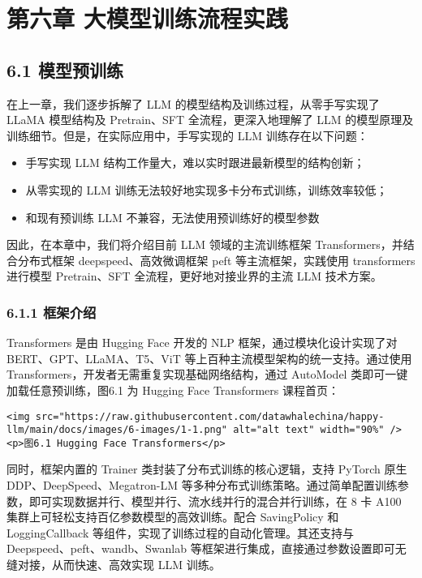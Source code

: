 \documentclass[
]{article}
\author{}
\date{}
\providecommand{\tightlist}{%
  \setlength{\itemsep}{0pt}\setlength{\parskip}{0pt}}
\begin{document}
{
\setcounter{tocdepth}{3}
\tableofcontents
}
\section{第六章
大模型训练流程实践}\label{ux7b2cux516dux7ae0-ux5927ux6a21ux578bux8badux7ec3ux6d41ux7a0bux5b9eux8df5}

\subsection{6.1 模型预训练}\label{ux6a21ux578bux9884ux8badux7ec3}

在上一章，我们逐步拆解了 LLM 的模型结构及训练过程，从零手写实现了 LLaMA
模型结构及 Pretrain、SFT 全流程，更深入地理解了 LLM
的模型原理及训练细节。但是，在实际应用中，手写实现的 LLM
训练存在以下问题：

\begin{itemize}
\tightlist
\item
  手写实现 LLM 结构工作量大，难以实时跟进最新模型的结构创新；
\item
  从零实现的 LLM 训练无法较好地实现多卡分布式训练，训练效率较低；
\item
  和现有预训练 LLM 不兼容，无法使用预训练好的模型参数
\end{itemize}

因此，在本章中，我们将介绍目前 LLM 领域的主流训练框架
Transformers，并结合分布式框架 deepspeed、高效微调框架 peft
等主流框架，实践使用 transformers 进行模型 Pretrain、SFT
全流程，更好地对接业界的主流 LLM 技术方案。

\subsubsection{6.1.1 框架介绍}\label{ux6846ux67b6ux4ecbux7ecd}

Transformers 是由 Hugging Face 开发的 NLP 框架，通过模块化设计实现了对
BERT、GPT、LLaMA、T5、ViT 等上百种主流模型架构的统一支持。通过使用
Transformers，开发者无需重复实现基础网络结构，通过 AutoModel
类即可一键加载任意预训练，图6.1 为 Hugging Face Transformers 课程首页：

\begin{verbatim}
<img src="https://raw.githubusercontent.com/datawhalechina/happy-llm/main/docs/images/6-images/1-1.png" alt="alt text" width="90%" />
<p>图6.1 Hugging Face Transformers</p>
\end{verbatim}

同时，框架内置的 Trainer 类封装了分布式训练的核心逻辑，支持 PyTorch 原生
DDP、DeepSpeed、Megatron-LM
等多种分布式训练策略。通过简单配置训练参数，即可实现数据并行、模型并行、流水线并行的混合并行训练，在
8 卡 A100 集群上可轻松支持百亿参数模型的高效训练。配合 SavingPolicy 和
LoggingCallback 等组件，实现了训练过程的自动化管理。其还支持与
Deepspeed、peft、wandb、Swanlab
等框架进行集成，直接通过参数设置即可无缝对接，从而快速、高效实现 LLM
训练。
\end{document}
